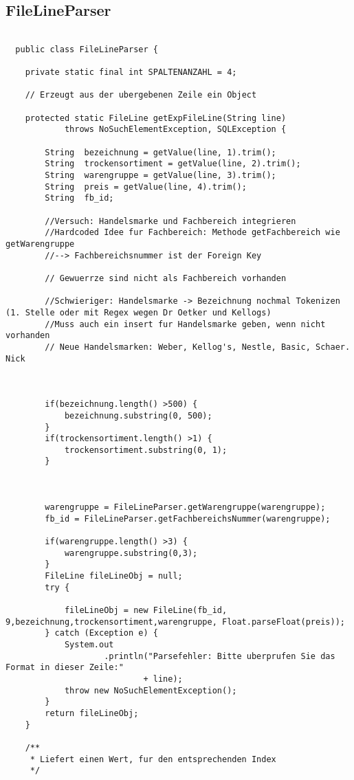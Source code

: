 \subsection{FileLineParser}

\begin{lstlisting}

  public class FileLineParser {

	private static final int SPALTENANZAHL = 4;

	// Erzeugt aus der ubergebenen Zeile ein Object

	protected static FileLine getExpFileLine(String line)
			throws NoSuchElementException, SQLException {

		String	bezeichnung = getValue(line, 1).trim();
		String	trockensortiment = getValue(line, 2).trim();
		String	warengruppe = getValue(line, 3).trim();
		String	preis = getValue(line, 4).trim();
		String 	fb_id;

		//Versuch: Handelsmarke und Fachbereich integrieren
		//Hardcoded Idee fur Fachbereich: Methode getFachbereich wie getWarengruppe
		//--> Fachbereichsnummer ist der Foreign Key

		// Gewuerrze sind nicht als Fachbereich vorhanden

		//Schwieriger: Handelsmarke -> Bezeichnung nochmal Tokenizen (1. Stelle oder mit Regex wegen Dr Oetker und Kellogs)
		//Muss auch ein insert fur Handelsmarke geben, wenn nicht vorhanden
		// Neue Handelsmarken: Weber, Kellog's, Nestle, Basic, Schaer. Nick



		if(bezeichnung.length() >500) {
			bezeichnung.substring(0, 500);
		}
		if(trockensortiment.length() >1) {
			trockensortiment.substring(0, 1);
		}



		warengruppe = FileLineParser.getWarengruppe(warengruppe);
		fb_id = FileLineParser.getFachbereichsNummer(warengruppe);

		if(warengruppe.length() >3) {
			warengruppe.substring(0,3);
		}
		FileLine fileLineObj = null;
		try {

			fileLineObj = new FileLine(fb_id, 9,bezeichnung,trockensortiment,warengruppe, Float.parseFloat(preis));
		} catch (Exception e) {
			System.out
					.println("Parsefehler: Bitte uberprufen Sie das Format in dieser Zeile:"
							+ line);
			throw new NoSuchElementException();
		}
		return fileLineObj;
	}

	/**
	 * Liefert einen Wert, fur den entsprechenden Index
	 */


\end{lstlisting}
